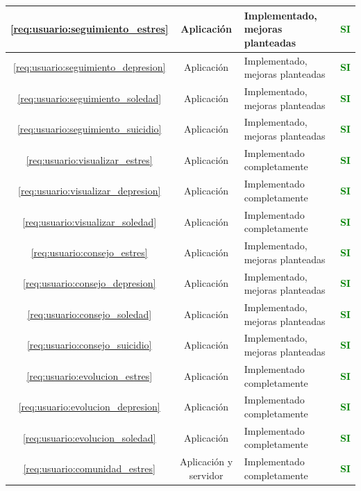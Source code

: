 \begin{xltabular}{\textwidth}{|c|c|X|c|}
        \ref{req:usuario:seguimiento_estres} & Aplicación & Implementado, mejoras planteadas & \textcolor{green}{\textbf{SI}} \\
        \hline
        \ref{req:usuario:seguimiento_depresion} & Aplicación & Implementado, mejoras planteadas & \textcolor{green}{\textbf{SI}} \\
        \hline
        \ref{req:usuario:seguimiento_soledad} & Aplicación & Implementado, mejoras planteadas & \textcolor{green}{\textbf{SI}} \\
        \hline
        \ref{req:usuario:seguimiento_suicidio} & Aplicación & Implementado, mejoras planteadas & \textcolor{green}{\textbf{SI}} \\
        \hline
        \ref{req:usuario:visualizar_estres} & Aplicación & Implementado completamente & \textcolor{green}{\textbf{SI}} \\
        \hline
        \ref{req:usuario:visualizar_depresion} & Aplicación & Implementado completamente & \textcolor{green}{\textbf{SI}} \\
        \hline
        \ref{req:usuario:visualizar_soledad} & Aplicación & Implementado completamente & \textcolor{green}{\textbf{SI}} \\
        \hline
        \ref{req:usuario:consejo_estres} & Aplicación & Implementado, mejoras planteadas & \textcolor{green}{\textbf{SI}} \\
        \hline
        \ref{req:usuario:consejo_depresion} & Aplicación & Implementado, mejoras planteadas & \textcolor{green}{\textbf{SI}} \\
        \hline
        \ref{req:usuario:consejo_soledad} & Aplicación & Implementado, mejoras planteadas & \textcolor{green}{\textbf{SI}} \\
        \hline
        \ref{req:usuario:consejo_suicidio} & Aplicación & Implementado, mejoras planteadas & \textcolor{green}{\textbf{SI}} \\
        \hline
        \ref{req:usuario:evolucion_estres} & Aplicación & Implementado completamente & \textcolor{green}{\textbf{SI}} \\
        \hline
        \ref{req:usuario:evolucion_depresion} & Aplicación & Implementado completamente & \textcolor{green}{\textbf{SI}} \\
        \hline
        \ref{req:usuario:evolucion_soledad} & Aplicación & Implementado completamente & \textcolor{green}{\textbf{SI}} \\
        \hline
        \ref{req:usuario:comunidad_estres} & Aplicación y servidor & Implementado completamente & \textcolor{green}{\textbf{SI}} \\

\end{xltabular}
